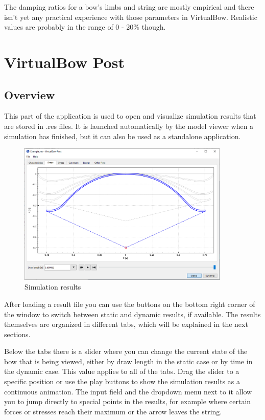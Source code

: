 \documentclass[12pt]{article}
\begin{document}
The damping ratios for a bow's limbs and string are mostly empirical and there isn't yet any practical experience with those parameters in VirtualBow.
Realistic values are probably in the range of 0 - 20\% though.



\newpage
\section{VirtualBow Post}

\subsection{Overview}

This part of the application is used to open and visualize simulation results that are stored in .res files.
It is launched automatically by the model viewer when a simulation has finished, but it can also be used as a standalone application.
\bigskip

\begin{figure}[H]
\centering
\includegraphics[width=0.9\textwidth]{figures/screenshots/output/result-window}
\caption{Simulation results}
\label{fig:result-window}
\end{figure}

After loading a result file you can use the buttons on the bottom right corner of the window to switch between static and dynamic results, if available.
The results themselves are organized in different tabs, which will be explained in the next sections.

Below the tabs there is a slider where you can change the current state of the bow that is being viewed, either by draw length in the static case or by time in the dynamic case.
This value applies to all of the tabs.
Drag the slider to a specific position or use the play buttons to show the simulation results as a continuous animation.
The input field and the dropdown menu next to it allow you to jump directly to special points in the results, for example where certain forces or stresses reach their maximum or the arrow leaves the string. 
\end{document}
